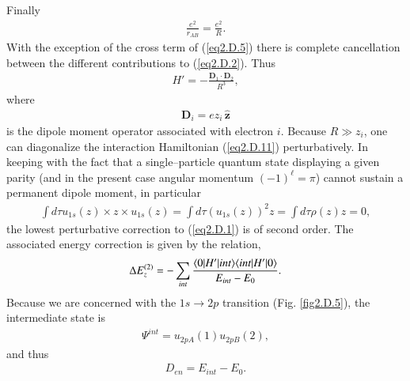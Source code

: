\begin{subappendices}
Finally
\begin{align}\label{eq2.D.10}
\frac{e^2}{r_{AB}}=\frac{e^2}{R}.
\end{align}
With the exception of the cross term of (\ref{eq2.D.5}) there is complete cancellation between the different contributions to (\ref{eq2.D.2}). Thus
\begin{align}\label{eq2.D.11}
H'=-\frac{\mathbf D_1\cdot\mathbf D_2}{R^3},
\end{align} 
where
\begin{align}\label{eq2.D.12}
\mathbf D_i=ez_i\,\hat {\mathbf{z}}
\end{align} 
is the dipole moment operator associated with electron $i$. Because $R\gg z_i$, one can diagonalize the interaction Hamiltonian (\ref{eq2.D.11}) perturbatively. In keeping with the fact that   a single--particle quantum state displaying a given parity (and in the present case angular momentum $(-1)^\ell=\pi$) cannot sustain a permanent dipole moment, in particular
\begin{align}\label{eq2.D.13}
\int d\tau u_{1s}(z)\times z\times u_{1s}(z)=\int d\tau (u_{1s}(z))^2z=\int d\tau \rho(z)z=0,
\end{align} 
 the lowest perturbative correction to (\ref{eq2.D.1}) is of second order. The associated energy correction is given by the relation,
 \begin{align}\label{eq2.D.14}
\Delta E_z^{(2)}=-\sum_{int}\frac{\langle {0|H'|int} \rangle\langle {int|H'|0} \rangle}{E_{int}-E_0}.
 \end{align} 
 Because we are concerned with the $1s\to 2p$ transition (Fig. \ref{fig2.D.5}), the intermediate state is
  \begin{align}\label{eq2.D.15}
\Psi^{int}=u_{2pA}(1)u_{2pB}(2),
  \end{align} 
 and thus
  \begin{align}\label{eq2.D.16}
D_{en}=E_{int}-E_0.
   \end{align} 
   

\end{subappendices}
